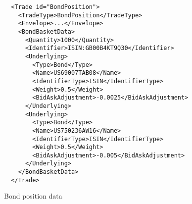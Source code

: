 \begin{listing}[H]
\begin{verbatim}
  <Trade id="BondPosition">
    <TradeType>BondPosition</TradeType>
    <Envelope>...</Envelope>
    <BondBasketData>
      <Quantity>1000</Quantity>
      <Identifier>ISIN:GB00B4KT9Q30</Identifier>
      <Underlying>
        <Type>Bond</Type>
        <Name>US69007TAB08</Name>
        <IdentifierType>ISIN</IdentifierType>
        <Weight>0.5</Weight>
        <BidAskAdjustment>-0.0025</BidAskAdjustment>
      </Underlying>
      <Underlying>
        <Type>Bond</Type>
        <Name>US750236AW16</Name>
        <IdentifierType>ISIN</IdentifierType>
        <Weight>0.5</Weight>
        <BidAskAdjustment>-0.005</BidAskAdjustment>
      </Underlying>
    </BondBasketData>
  </Trade>
\end{verbatim}
\caption{Bond position data}
\label{lst:bondbasketdata}
\end{listing}
